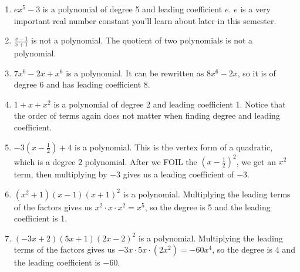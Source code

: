 \documentclass[noauthor]{ximera}
\begin{document}
\begin{problem}
\begin{explanation}
\begin{enumerate}
\begin{enumerate}
        \item \(ex^5 - 3\) is a polynomial of degree 5 and leading coefficient \(e\). \(e\) is a very important real number constant you'll learn about later in this semester.
        
        \item \(\frac{x - 1}{x + 1}\) is not a polynomial. The quotient of two polynomials is not a polynomial.
        \item \(7x^6 - 2x + x^6\) is a polynomial. It can be rewritten as \(8x^6 - 2x\), so it is of degree 6 and has leading coefficient 8.
        \item \(1 + x + x^2\) is a polynomial of degree 2 and leading coefficient 1. Notice that the order of terms again does not matter when finding degree and leading coefficient.
        \item \(-3\left(x - \frac{1}{2}\right) + 4\) is a polynomial. This is the vertex form of a quadratic, which is a degree 2 polynomial. After we FOIL the 
        \(\left(x - \frac{1}{2}\right)^2\), we get an \(x^2\) term, then multiplying by \(-3\) gives us a leading coefficient of \(-3\).
        \item \((x^2 + 1)(x - 1)(x + 1)^2\) is a polynomial. Multiplying the leading terms of the factors gives us \(x^2 \cdot x \cdot x^2 = x^5\), so the degree is 5
        and the leading coefficient is 1.
        \item \((-3x + 2)(5x + 1)(2x - 2)^2\) is a polynomial. Multiplying the leading terms of the factors gives us \(-3x \cdot 5x \cdot (2x^2) = -60x^4\), so the degree is 4
        and the leading coefficient is \(-60\).
        

    \end{enumerate}
\end{enumerate}
\end{explanation}
\end{problem}
\end{document}
